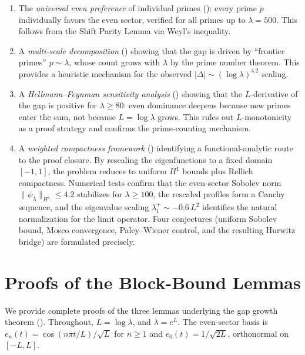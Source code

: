 \documentclass[12pt,a4paper]{article}
\theoremstyle{definition}
\theoremstyle{remark}
\begin{document}
\begin{enumerate}
  \item The \emph{universal even preference} of individual primes (): every prime $p$ individually favors the even sector, verified for all primes up to $\lambda = 500$. This follows from the Shift Parity Lemma via Weyl's inequality.
  \item A \emph{multi-scale decomposition} () showing that the gap is driven by ``frontier primes'' $p \sim \lambda$, whose count grows with $\lambda$ by the prime number theorem. This provides a heuristic mechanism for the observed $|\Delta| \sim (\log\lambda)^{4.2}$ scaling.
  \item A \emph{Hellmann--Feynman sensitivity analysis} () showing that the $L$-derivative of the gap is positive for $\lambda \geq 80$: even dominance deepens because new primes enter the sum, not because $L = \log\lambda$ grows. This rules out $L$-monotonicity as a proof strategy and confirms the prime-counting mechanism.
  \item A \emph{weighted compactness framework} () identifying a functional-analytic route to the proof closure. By rescaling the eigenfunctions to a fixed domain $[-1,1]$, the problem reduces to uniform $H^1$ bounds plus Rellich compactness. Numerical tests confirm that the even-sector Sobolev norm $\|\psi_\lambda\|_{H^1} \leq 4.2$ stabilizes for $\lambda \geq 100$, the rescaled profiles form a Cauchy sequence, and the eigenvalue scaling $\lambda_1^+ \sim -0.6\,L^2$ identifies the natural normalization for the limit operator. Four conjectures (uniform Sobolev bound, Mosco convergence, Paley--Wiener control, and the resulting Hurwitz bridge) are formulated precisely.
\end{enumerate}

\appendix
\section{Proofs of the Block-Bound Lemmas}
\label{app:block-proofs}

We provide complete proofs of the three lemmas underlying the gap growth theorem (). Throughout, $L = \log\lambda$, and $\lambda = e^L$. The even-sector basis is $e_n(t) = \cos(n\pi t/L)/\sqrt{L}$ for $n \geq 1$ and $e_0(t) = 1/\sqrt{2L}$, orthonormal on $[-L, L]$.
\end{document}
